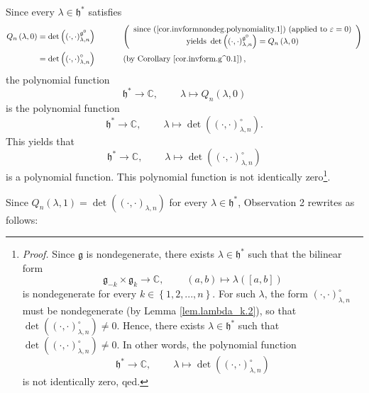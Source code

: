 \documentclass[etingof-lie.tex]{subfiles}
\begin{document}
Since every $\lambda\in\mathfrak{h}^{\ast}$ satisfies%
\begin{align*}
Q_{n}\left(  \lambda,0\right)   &  =\det\left(  \left(  \cdot,\cdot\right)
_{\lambda,n}^{\mathfrak{g}^{0}}\right)  \ \ \ \ \ \ \ \ \ \ \left(
\begin{array}
[c]{c}%
\text{since (\ref{cor.invformnondeg.polynomiality.1}) (applied to }%
\varepsilon=0\text{)}\\
\text{yields }\det\left(  \left(  \cdot,\cdot\right)  _{\lambda,n}%
^{\mathfrak{g}^{0}}\right)  =Q_{n}\left(  \lambda,0\right)
\end{array}
\right) \\
&  =\det\left(  \left(  \cdot,\cdot\right)  _{\lambda,n}^{\circ}\right)
\ \ \ \ \ \ \ \ \ \ \left(  \text{by Corollary \ref{cor.invform.g^0.1}%
}\right)  ,
\end{align*}
the polynomial function%
\[
\mathfrak{h}^{\ast}\rightarrow\mathbb{C},\ \ \ \ \ \ \ \ \ \ \lambda\mapsto
Q_{n}\left(  \lambda,0\right)
\]
is the polynomial function%
\[
\mathfrak{h}^{\ast}\rightarrow\mathbb{C},\ \ \ \ \ \ \ \ \ \ \lambda
\mapsto\det\left(  \left(  \cdot,\cdot\right)  _{\lambda,n}^{\circ}\right)  .
\]
This yields that%
\[
\mathfrak{h}^{\ast}\rightarrow\mathbb{C},\ \ \ \ \ \ \ \ \ \ \lambda
\mapsto\det\left(  \left(  \cdot,\cdot\right)  _{\lambda,n}^{\circ}\right)
\]
is a polynomial function. This polynomial function is not identically
zero\footnote{\textit{Proof.} Since $\mathfrak{g}$ is nondegenerate, there
exists $\lambda\in\mathfrak{h}^{\ast}$ such that the bilinear form%
\[
\mathfrak{g}_{-k}\times\mathfrak{g}_{k}\rightarrow\mathbb{C}%
,\ \ \ \ \ \ \ \ \ \ \left(  a,b\right)  \mapsto\lambda\left(  \left[
a,b\right]  \right)
\]
is nondegenerate for every $k\in\left\{  1,2,...,n\right\}  $. For such
$\lambda$, the form $\left(  \cdot,\cdot\right)  _{\lambda,n}^{\circ}$ must be
nondegenerate (by Lemma \ref{lem.lambda_k.2}), so that $\det\left(  \left(
\cdot,\cdot\right)  _{\lambda,n}^{\circ}\right)  \neq0$. Hence, there exists
$\lambda\in\mathfrak{h}^{\ast}$ such that $\det\left(  \left(  \cdot
,\cdot\right)  _{\lambda,n}^{\circ}\right)  \neq0$. In other words, the
polynomial function%
\[
\mathfrak{h}^{\ast}\rightarrow\mathbb{C},\ \ \ \ \ \ \ \ \ \ \lambda
\mapsto\det\left(  \left(  \cdot,\cdot\right)  _{\lambda,n}^{\circ}\right)
\]
is not identically zero, qed.}.

Since $Q_{n}\left(  \lambda,1\right)  =\det\left(  \left(  \cdot,\cdot\right)
_{\lambda,n}\right)  $ for every $\lambda\in\mathfrak{h}^{\ast}$, Observation
2 rewrites as follows:
\end{document}
